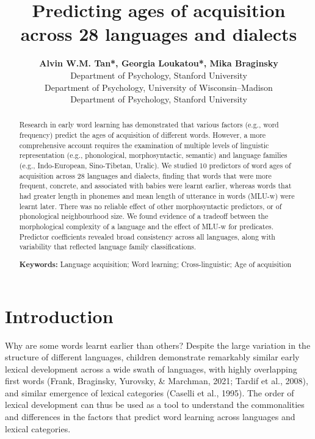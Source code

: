\documentclass[10pt, letterpaper]{article}
\title{Predicting ages of acquisition across 28 languages and dialects}
\author{{\large \bf Alvin W.M. Tan*, Georgia Loukatou*, Mika Braginsky} \\ Department of Psychology, Stanford University \AND {\large \bf Jessica Mankewitz} \\ Department of Psychology, University of Wisconsin--Madison \AND {\large \bf Michael C. Frank} \\ Department of Psychology, Stanford University}
\begin{document}
\maketitle

\begin{abstract}
Research in early word learning has demonstrated that various factors
(e.g., word frequency) predict the ages of acquisition of different
words. However, a more comprehensive account requires the examination of
multiple levels of linguistic representation (e.g., phonological,
morphosyntactic, semantic) and language families (e.g., Indo-European,
Sino-Tibetan, Uralic). We studied 10 predictors of word ages of
acquisition across 28 languages and dialects, finding that words that
were more frequent, concrete, and associated with babies were learnt
earlier, whereas words that had greater length in phonemes and mean
length of utterance in words (MLU-w) were learnt later. There was no
reliable effect of other morphosyntactic predictors, or of phonological
neighbourhood size. We found evidence of a tradeoff between the
morphological complexity of a language and the effect of MLU-w for
predicates. Predictor coefficients revealed broad consistency across all
languages, along with variability that reflected language family
classifications.

\textbf{Keywords:}
Language acquisition; Word learning; Cross-linguistic; Age of
acquisition
\end{abstract}

\hypertarget{introduction}{%
\section{Introduction}\label{introduction}}

Why are some words learnt earlier than others? Despite the large
variation in the structure of different languages, children demonstrate
remarkably similar early lexical development across a wide swath of
languages, with highly overlapping first words (Frank, Braginsky,
Yurovsky, \& Marchman, 2021; Tardif et al., 2008), and similar emergence
of lexical categories (Caselli et al., 1995). The order of lexical
development can thus be used as a tool to understand the commonalities
and differences in the factors that predict word learning across
languages and lexical categories.
\end{document}
